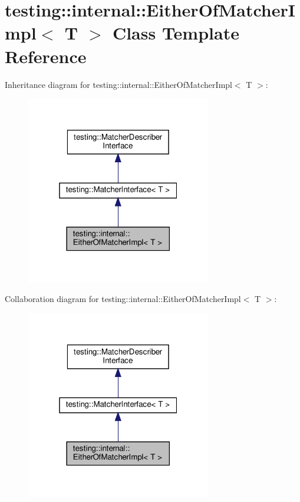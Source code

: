 \hypertarget{classtesting_1_1internal_1_1_either_of_matcher_impl}{}\section{testing\+:\+:internal\+:\+:Either\+Of\+Matcher\+Impl$<$ T $>$ Class Template Reference}
\label{classtesting_1_1internal_1_1_either_of_matcher_impl}


Inheritance diagram for testing\+:\+:internal\+:\+:Either\+Of\+Matcher\+Impl$<$ T $>$\+:
\nopagebreak
\begin{figure}[H]
\begin{center}
\leavevmode
\includegraphics[width=229pt]{classtesting_1_1internal_1_1_either_of_matcher_impl__inherit__graph}
\end{center}
\end{figure}


Collaboration diagram for testing\+:\+:internal\+:\+:Either\+Of\+Matcher\+Impl$<$ T $>$\+:
\nopagebreak
\begin{figure}[H]
\begin{center}
\leavevmode
\includegraphics[width=229pt]{classtesting_1_1internal_1_1_either_of_matcher_impl__coll__graph}
\end{center}
\end{figure}
